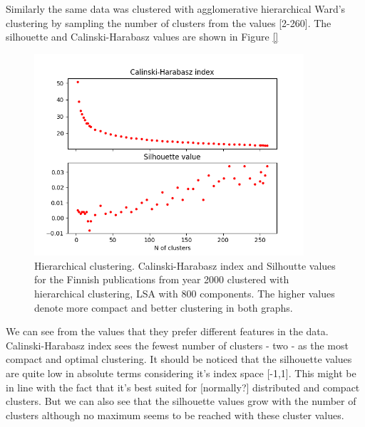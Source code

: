 Similarly the same data was clustered with agglomerative 
hierarchical Ward's clustering by sampling the number of clusters 
from the values [2-260]. The silhouette and Calinski-Harabasz values
are shown in Figure \ref{}
\begin{figure}[ht]
  \begin{center}    
\includegraphics[width=10cm]{images/c-h-silh-index-plot-y2000-2_260-800-hierarchical.png}
    \caption{Hierarchical clustering. Calinski-Harabasz index and Silhoutte values for the
    Finnish publications from year 2000 clustered with hierarchical
    clustering, LSA with 800 components. The higher values denote 
    more compact and better clustering in both graphs.}
    \label{fig:ch-silh-2000-01}
  \end{center}
\end{figure}
We can see from the values that they prefer different features in
the data. Calinski-Harabasz index sees the fewest number of 
clusters - two - as the most compact and optimal clustering. 
It should be noticed that the silhouette values are quite low 
in absolute terms considering it's index space [-1,1]. This might 
be in line with the fact that it's best suited for [normally?] 
distributed and compact clusters. But we can also see that the 
silhouette values grow with the number of clusters although no
maximum seems to be reached with these cluster values.



